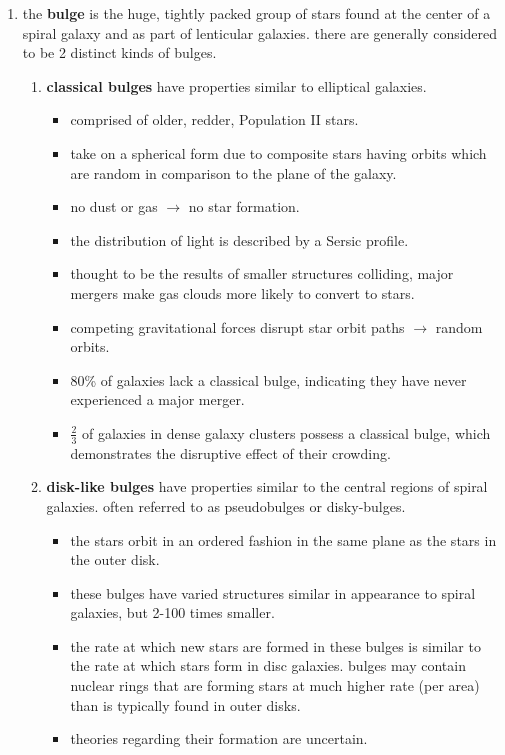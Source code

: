 \begin{enumerate}
	\item the \textbf{bulge} is the huge, tightly packed group of stars found at the center of a spiral galaxy and as part of lenticular galaxies. there are generally considered to be 2 distinct kinds of bulges.
		\begin{enumerate}
			\item \textbf{classical bulges} have properties similar to elliptical galaxies.
				\begin{itemize}[noitemsep]
					\item comprised of older, redder, Population II stars.
					\item take on a spherical form due to composite stars having orbits which are random in comparison to the plane of the galaxy.
					\item no dust or gas $\rightarrow$ no star formation.
					\item the distribution of light is described by a Sersic profile.
					\item thought to be the results of smaller structures colliding, major mergers make gas clouds more likely to convert to stars.
					\item competing gravitational forces disrupt star orbit paths $\rightarrow$ random orbits.
					\item 80\% of galaxies lack a classical bulge, indicating they have never experienced a major merger.
					\item $\frac{2}{3}$ of galaxies in dense galaxy clusters possess a classical bulge, which demonstrates the disruptive effect of their crowding.
				\end{itemize}
			\item \textbf{disk-like bulges} have properties similar to the central regions of spiral galaxies. often referred to as pseudobulges or disky-bulges.
				\begin{itemize}[noitemsep]
					\item the stars orbit in an ordered fashion in the same plane as the stars in the outer disk.
					\item these bulges have varied structures similar in appearance to spiral galaxies, but 2-100 times smaller.
					\item the rate at which new stars are formed in these bulges is similar to the rate at which stars form in disc galaxies. bulges may contain nuclear rings that are forming stars at much higher rate (per area) than is typically found in outer disks.
					\item theories regarding their formation are uncertain.

\end{itemize}
\end{enumerate}
\end{enumerate}
